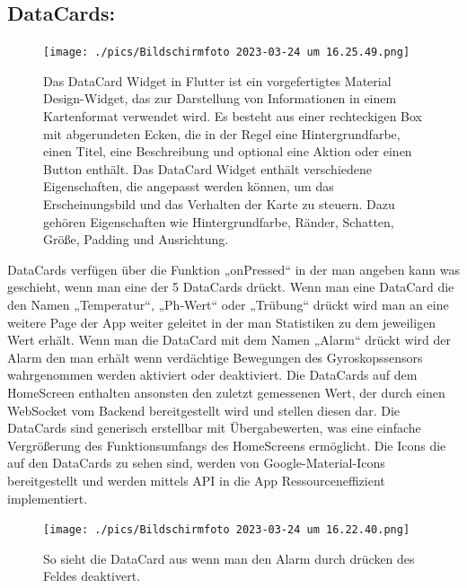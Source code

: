   \subsection*{DataCards:}
  \begin{figure}[h!]
    \begin{minipage}[c]{0.5\textwidth}
      \texttt{[image: ./pics/Bildschirm­foto 2023-03-24 um 16.25.49.png]}
    \end{minipage}
    \begin{minipage}[c]{0.5\textwidth}
      \label{fig:DataCard}
      Das DataCard Widget in Flutter ist ein vorgefertigtes Material Design-Widget, das zur Darstellung von Informationen in einem Kartenformat verwendet wird. 
      Es besteht aus einer rechteckigen Box mit abgerundeten Ecken, die in der Regel eine Hintergrundfarbe, einen Titel, eine Beschreibung und optional eine Aktion oder einen Button enthält.
      Das DataCard Widget enthält verschiedene Eigenschaften, die angepasst werden können, um das Erscheinungsbild und das Verhalten der Karte zu steuern. Dazu gehören Eigenschaften wie Hintergrundfarbe, Ränder, Schatten, Größe, Padding und Ausrichtung.  
    \end{minipage}
  \end{figure}
DataCards verfügen über die Funktion „onPressed“ in der man angeben kann was geschieht, wenn man eine der 5 DataCards drückt. Wenn man eine DataCard die den Namen „Temperatur“, „Ph-Wert“ oder „Trübung“ drückt wird man an eine weitere Page der App weiter geleitet in der man Statistiken zu dem jeweiligen Wert erhält. Wenn man die DataCard mit dem Namen „Alarm“ drückt wird der Alarm den man erhält wenn verdächtige Bewegungen des Gyroskopssensors wahrgenommen werden aktiviert oder deaktiviert.
Die DataCards auf dem HomeScreen enthalten ansonsten den zuletzt gemessenen Wert, der durch einen WebSocket vom Backend bereitgestellt wird und stellen diesen dar. Die DataCards sind generisch erstellbar mit Übergabewerten, was eine einfache Vergrößerung des Funktionsumfangs des HomeScreens ermöglicht.
Die Icons die auf den DataCards zu sehen sind, werden von Google-Material-Icons bereitgestellt und werden mittels API in die App Ressourceneffizient implementiert.
\begin{figure}[h!]
    \begin{minipage}[c]{0.5\textwidth}
      \texttt{[image: ./pics/Bildschirm­foto 2023-03-24 um 16.22.40.png]}
    \end{minipage}
    \begin{minipage}[c]{0.5\textwidth}
      \label{fig:AlarmOFF}
      So sieht die DataCard aus wenn man den Alarm durch drücken des Feldes deaktivert.
    \end{minipage}
\end{figure}
\newpage
